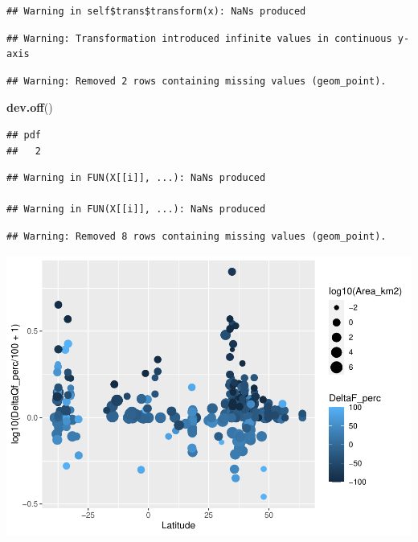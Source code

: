 \documentclass[]{elsarticle} %
\newenvironment{Shaded}{\begin{snugshade}}{\end{snugshade}}
\newcommand{\DataTypeTok}[1]{\textcolor[rgb]{0.13,0.29,0.53}{#1}}
\newcommand{\DecValTok}[1]{\textcolor[rgb]{0.00,0.00,0.81}{#1}}
\newcommand{\KeywordTok}[1]{\textcolor[rgb]{0.13,0.29,0.53}{\textbf{#1}}}
\newcommand{\NormalTok}[1]{#1}
\newcommand{\OperatorTok}[1]{\textcolor[rgb]{0.81,0.36,0.00}{\textbf{#1}}}
\newcommand{\StringTok}[1]{\textcolor[rgb]{0.31,0.60,0.02}{#1}}
\begin{document}
\begin{verbatim}
## Warning in self$trans$transform(x): NaNs produced
\end{verbatim}

\begin{verbatim}
## Warning: Transformation introduced infinite values in continuous y-axis
\end{verbatim}

\begin{verbatim}
## Warning: Removed 2 rows containing missing values (geom_point).
\end{verbatim}

\begin{Shaded}
\begin{Highlighting}[]
\KeywordTok{dev.off}\NormalTok{()}
\end{Highlighting}
\end{Shaded}

\begin{verbatim}
## pdf 
##   2
\end{verbatim}

\begin{Shaded}
\end{Shaded}

\begin{verbatim}
## Warning in FUN(X[[i]], ...): NaNs produced

## Warning in FUN(X[[i]], ...): NaNs produced
\end{verbatim}

\begin{verbatim}
## Warning: Removed 8 rows containing missing values (geom_point).
\end{verbatim}

\includegraphics{Forest_and_Water_files/figure-latex/unnamed-chunk-7-1.pdf}
\end{document}
